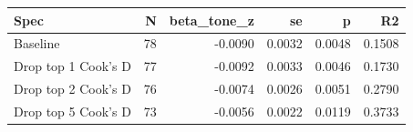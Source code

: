 \begin{tabular}{lrrrrr}
\toprule
Spec & N & beta_tone_z & se & p & R2 \\
\midrule
Baseline & 78 & -0.0090 & 0.0032 & 0.0048 & 0.1508 \\
Drop top 1 Cook's D & 77 & -0.0092 & 0.0033 & 0.0046 & 0.1730 \\
Drop top 2 Cook's D & 76 & -0.0074 & 0.0026 & 0.0051 & 0.2790 \\
Drop top 5 Cook's D & 73 & -0.0056 & 0.0022 & 0.0119 & 0.3733 \\
\bottomrule
\end{tabular}
